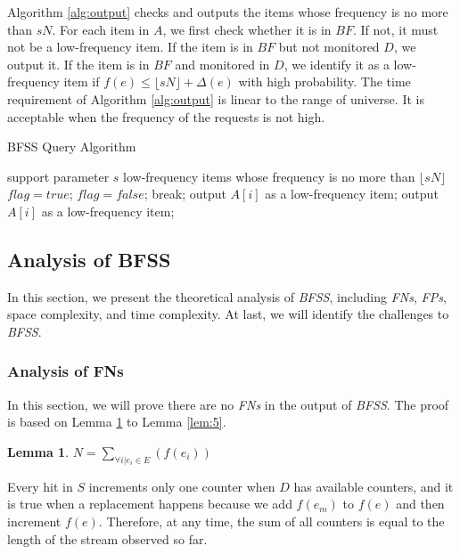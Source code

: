 \documentclass[conference]{IEEEtran}
\begin{document}
Algorithm \ref{alg:output} checks and outputs the items whose frequency is no more than $sN$. For each item in $A$, we first check whether it is in $BF$. If not, it must not be a low-frequency item. If the item is in $BF$ but not monitored $D$, we output it. If the item is in $BF$ and monitored in $D$, we identify it as a low-frequency item if $f(e)\leq\lfloor sN\rfloor+\Delta(e)$ with high probability. The time requirement of Algorithm \ref{alg:output} is linear to the range of universe. It is acceptable when the frequency of the requests is not high. 

\begin{algorithm}[h]
	\caption{BFSS Query Algorithm}
	\label{alg:output}
	\begin{algorithmic}[1]
		\REQUIRE support parameter $s$
		\ENSURE low-frequency items whose frequency is no more than $\lfloor sN\rfloor$ 
		\STATE $flag=true$;
		\STATE $flag=false$;
		\STATE break;
		\ENDIF
		\ENDFOR
		\STATE output $A[i]$ as a low-frequency item;
		\ENDIF
		\ELSE
		\STATE output $A[i]$ as a low-frequency item;
		\ENDIF
		\ENDIF
		\ENDFOR
	\end{algorithmic}
\end{algorithm}
\subsection{Analysis of BFSS}
In this section, we present the theoretical analysis of \emph{BFSS}, including \emph{FNs}, \emph{FPs}, space complexity, and time complexity. At last, we will identify the challenges to \emph{BFSS}. \par

\subsubsection{\textbf{Analysis of FNs}}
In this section, we will prove there are no \emph{FNs} in the output of \emph{BFSS}. The proof is based on Lemma \ref{lem:1} to Lemma \ref{lem:5}.\par

\newtheorem{lemma}{Lemma}
\begin{lemma}\label{lem:1}
  $N=\sum_{\forall i|e_i \in E}(f(e_i))$
\end{lemma}

\begin{IEEEproof}
Every hit in $S$ increments only one counter when $D$ has available counters, and it is true when a replacement happens because we add $f(e_m)$ to $f(e)$ and then increment $f(e)$. Therefore, at any time, the sum of all counters is equal to the length of the stream observed so far.
\end{IEEEproof}
\end{document}
